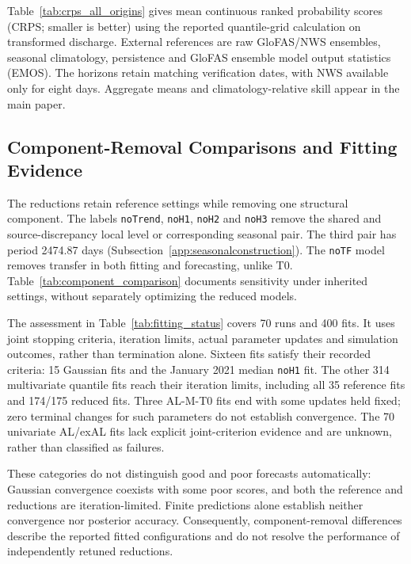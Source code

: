 \documentclass[APA,STIX1COL]{WileyNJD-v2}
\begin{document}
Table~\ref{tab:crps_all_origins} gives mean continuous ranked probability scores (CRPS; smaller is better) using the reported quantile-grid calculation on transformed discharge. External references are raw GloFAS/NWS ensembles, seasonal climatology, persistence and GloFAS ensemble model output statistics (EMOS). The horizons retain matching verification dates, with NWS available only for eight days. Aggregate means and climatology-relative skill appear in the main paper.



\subsection{Component-Removal Comparisons and Fitting Evidence}
\label{app:he3ablation}

The reductions retain reference settings while removing one structural component. The labels \texttt{noTrend}, \texttt{noH1}, \texttt{noH2} and \texttt{noH3} remove the shared and source-discrepancy local level or corresponding seasonal pair. The third pair has period 2474.87 days (Subsection~\ref{app:seasonalconstruction}). The \texttt{noTF} model removes transfer in both fitting and forecasting, unlike T0. Table~\ref{tab:component_comparison} documents sensitivity under inherited settings, without separately optimizing the reduced models.



\label{app:fitdiagnostics}
The assessment in Table~\ref{tab:fitting_status} covers 70 runs and 400 fits. It uses joint stopping criteria, iteration limits, actual parameter updates and simulation outcomes, rather than termination alone. Sixteen fits satisfy their recorded criteria: 15 Gaussian fits and the January 2021 median \texttt{noH1} fit. The other 314 multivariate quantile fits reach their iteration limits, including all 35 reference fits and 174/175 reduced fits. Three AL-M-T0 fits end with some updates held fixed; zero terminal changes for such parameters do not establish convergence. The 70 univariate AL/exAL fits lack explicit joint-criterion evidence and are unknown, rather than classified as failures.



These categories do not distinguish good and poor forecasts automatically: Gaussian convergence coexists with some poor scores, and both the reference and reductions are iteration-limited. Finite predictions alone establish neither convergence nor posterior accuracy. Consequently, component-removal differences describe the reported fitted configurations and do not resolve the performance of independently retuned reductions.
\end{document}

